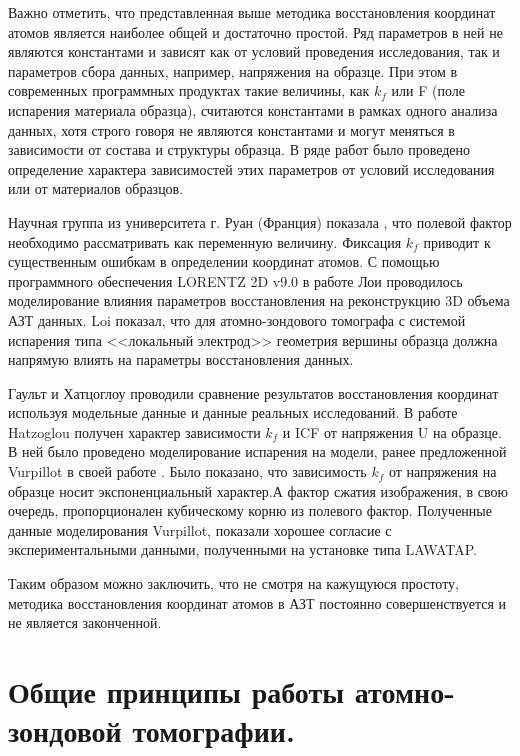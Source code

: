 Важно отметить, что представленная выше методика восстановления координат атомов является наиболее общей и достаточно простой. Ряд параметров в ней не являются константами и зависят как от условий проведения исследования, так и параметров сбора данных, например, напряжения на образце. При этом в современных программных продуктах такие величины, как $k_f$ или F (поле испарения материала образца), считаются константами в рамках одного анализа данных, хотя строго говоря не являются константами и могут меняться в зависимости от состава и структуры образца. В ряде работ было проведено определение характера зависимостей этих параметров от условий исследования или от материалов образцов.

Научная группа из университета г. Руан (Франция) показала \cite{Gault11_Loi}, что полевой фактор необходимо рассматривать как переменную величину. Фиксация $k_f$ приводит к существенным ошибкам в определении координат атомов. С помощью программного обеспечения LORENTZ 2D v9.0 \cite{Asi02} в работе Лои \cite{Loi13} проводилось моделирование влияния параметров восстановления на реконструкцию 3D объема АЗТ данных. Loi показал, что для атомно-зондового томографа с системой испарения типа <<локальный электрод>> геометрия вершины образца должна напрямую влиять на параметры восстановления данных.

Гаульт \cite{Gault11_Loi} и Хатцоглоу \cite{Hatzoglou19} проводили сравнение результатов восстановления координат используя модельные данные и данные реальных исследований. В работе Hatzoglou \cite{Hatzoglou19} получен характер зависимости $k_f$ и ICF от напряжения U на образце. В ней было проведено моделирование испарения на модели, ранее предложенной Vurpillot в своей работе \cite{Vurpillot13}. Было показано, что зависимость $k_f$ от напряжения на образце носит экспоненциальный характер.А фактор сжатия изображения, в свою очередь, пропорционален кубическому корню из полевого фактор. Полученные данные моделирования Vurpillot, показали хорошее согласие с экспериментальными данными, полученными на установке типа LAWATAP.

Таким образом можно заключить, что не смотря на кажущуюся простоту, методика восстановления координат атомов в АЗТ постоянно совершенствуется и не является законченной. 


\FloatBarrier

\section{Общие принципы работы атомно-зондовой томографии.}\label{sec:ch1/sec4}

